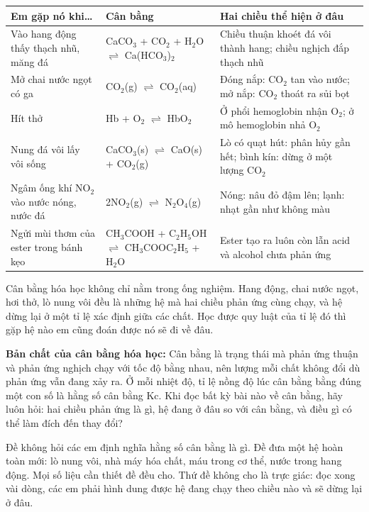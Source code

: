 \Needspace{5cm}
{\small
\begin{center}
\renewcommand{\arraystretch}{1.3}
\begin{tabular}{|>{\raggedright\arraybackslash}p{}|>{\raggedright\arraybackslash}p{}|>{\raggedright\arraybackslash}p{}|}
\hline
\rowcolor{pastelBlue}
\textbf{Em gặp nó khi…} & \textbf{Cân bằng} & \textbf{Hai chiều thể hiện ở đâu} \\
\hline
Vào hang động thấy thạch nhũ, măng đá & CaCO$_{3}$ + CO$_{2}$ + H$_{2}$O $\rightleftharpoons$ Ca(HCO$_{3}$)$_{2}$ & Chiều thuận khoét đá vôi thành hang; chiều nghịch đắp thạch nhũ \\
\hline
Mở chai nước ngọt có ga & CO$_{2}$(g) $\rightleftharpoons$ CO$_{2}$(aq) & Đóng nắp: CO$_{2}$ tan vào nước; mở nắp: CO$_{2}$ thoát ra sủi bọt \\
\hline
Hít thở & Hb + O$_{2}$ $\rightleftharpoons$ HbO$_{2}$ & Ở phổi hemoglobin nhận O$_{2}$; ở mô hemoglobin nhả O$_{2}$ \\
\hline
Nung đá vôi lấy vôi sống & CaCO$_{3}$(s) $\rightleftharpoons$ CaO(s) + CO$_{2}$(g) & Lò có quạt hút: phân hủy gần hết; bình kín: dừng ở một lượng CO$_{2}$ \\
\hline
Ngâm ống khí NO$_{2}$ vào nước nóng, nước đá & 2NO$_{2}$(g) $\rightleftharpoons$ N$_{2}$O$_{4}$(g) & Nóng: nâu đỏ đậm lên; lạnh: nhạt gần như không màu \\
\hline
Ngửi mùi thơm của ester trong bánh kẹo & CH$_{3}$COOH + C$_{2}$H$_{5}$OH $\rightleftharpoons$ CH$_{3}$COOC$_{2}$H$_{5}$ + H$_{2}$O & Ester tạo ra luôn còn lẫn acid và alcohol chưa phản ứng \\
\hline
\end{tabular}
\end{center}
}
\begin{notebox}Cân bằng hóa học không chỉ nằm trong ống nghiệm. Hang động, chai nước ngọt, hơi thở, lò nung vôi đều là những hệ mà hai chiều phản ứng cùng chạy, và hệ dừng lại ở một tỉ lệ xác định giữa các chất. Học được quy luật của tỉ lệ đó thì gặp hệ nào em cũng đoán được nó sẽ đi về đâu.\end{notebox}
\begin{notebox}\textbf{Bản chất của cân bằng hóa học:} Cân bằng là trạng thái mà phản ứng thuận và phản ứng nghịch chạy với tốc độ bằng nhau, nên lượng mỗi chất không đổi dù phản ứng vẫn đang xảy ra. Ở mỗi nhiệt độ, tỉ lệ nồng độ lúc cân bằng bằng đúng một con số là hằng số cân bằng Kc. Khi đọc bất kỳ bài nào về cân bằng, hãy luôn hỏi: hai chiều phản ứng là gì, hệ đang ở đâu so với cân bằng, và điều gì có thể làm đích đến thay đổi?\end{notebox}
Đề không hỏi các em định nghĩa hằng số cân bằng là gì. Đề đưa một hệ hoàn toàn mới: lò nung vôi, nhà máy hóa chất, máu trong cơ thể, nước trong hang động. Mọi số liệu cần thiết đề đều cho. Thứ đề không cho là trực giác: đọc xong vài dòng, các em phải hình dung được hệ đang chạy theo chiều nào và sẽ dừng lại ở đâu.

